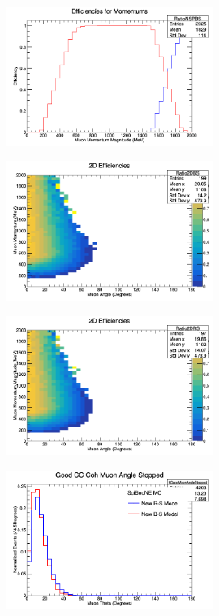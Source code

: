 \documentclass[11pt]{article}
\begin{document}
\begin{figure}[H]
\centering
\includegraphics[width=0.6\textwidth]{ANMCombinedPlotsImages/4-ANMCombinedPlots.png}
\caption{}
\end{figure}

\begin{figure}[H]
\centering
\includegraphics[width=0.6\textwidth]{ANMCombinedPlotsImages/5-ANMCombinedPlots.png}
\caption{}
\end{figure}

\begin{figure}[H]
\centering
\includegraphics[width=0.6\textwidth]{ANMCombinedPlotsImages/6-ANMCombinedPlots.png}
\caption{}
\end{figure}

\begin{figure}[H]
\centering
\includegraphics[width=0.6\textwidth]{ANMCombinedPlotsImages/7-ANMCombinedPlots.png}
\caption{}
\end{figure}
\end{document}
